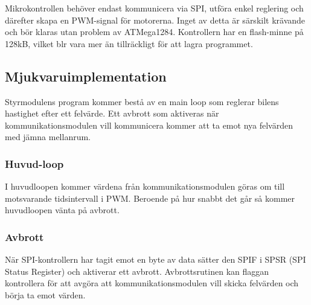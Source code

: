 \documentclass[designspec/spec.tex]{subfiles}
\begin{document}
Mikrokontrollen behöver endast kommunicera via SPI, utföra enkel reglering och
därefter skapa en PWM-signal för motorerna. Inget av detta är särskilt krävande
och bör klaras utan problem av ATMega1284. Kontrollern har en flash-minne på
128kB, vilket blr vara mer än tillräckligt för att lagra programmet.

\subsection{Mjukvaruimplementation}
Styrmodulens program kommer bestå av en main loop som reglerar bilens hastighet
efter ett felvärde. Ett avbrott som aktiveras när kommunikationsmodulen vill
kommunicera kommer att ta emot nya felvärden med jämna mellanrum.

\subsubsection{Huvud-loop}
I huvudloopen kommer värdena från kommunikationsmodulen göras om till
motsvarande tidsintervall i PWM. Beroende på hur snabbt det går så kommer
huvudloopen vänta på avbrott.

\subsubsection{Avbrott} \label{sec:ctrl-int}
När SPI-kontrollern har tagit emot en byte av data sätter den SPIF i SPSR (SPI
Status Register) och aktiverar ett avbrott. Avbrottsrutinen kan flaggan
kontrollera för att avgöra att kommunikationsmodulen vill skicka felvärden och
börja ta emot värden.
\end{document}
